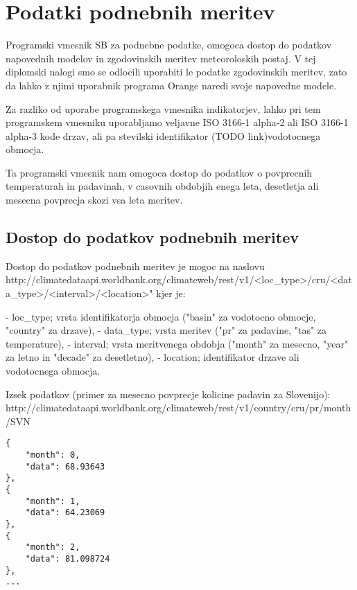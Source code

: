 \section{Podatki podnebnih meritev}

Programski vmesnik SB za podnebne podatke, omogoca dostop do podatkov 
napovednih modelov in zgodovinskih meritev meteoroloskih postaj. V tej 
diplomski nalogi smo se odlocili uporabiti le podatke zgodovinskih meritev, 
zato da lahko z njimi uporabnik programa Orange naredi svoje napovedne modele.

Za razliko od uporabe programskega vmesnika indikatorjev, lahko pri tem
programskem vmesniku uporabljamo veljavne ISO 3166-1 alpha-2 ali ISO 3166-1 
alpha-3 kode drzav, ali pa stevilski identifikator (TODO link)vodotocnega 
obmocja.

Ta programski vmesnik nam omogoca dostop do podatkov o povprecnih temperaturah 
in padavinah, v casovnih obdobjih enega leta, desetletja ali mesecna povprecja 
skozi vsa leta meritev.



\subsection{Dostop do podatkov podnebnih meritev}

Dostop do podatkov podnebnih meritev je mogoc na naslovu
http://climatedataapi.worldbank.org/climateweb/rest/v1/<loc\_type>/cru/<data\_type>/<interval>/<location>"  
kjer je:

- loc\_type; vrsta identifikatorja obmocja ("basin" za vodotocno obmocje, 
  "country" za drzave),
- data\_type; vrsta meritev ("pr" za padavine, "tas" za temperature),
- interval; vrsta meritvenega obdobja ("month" za mesecno, "year" za letno in
  "decade" za desetletno),
- location; identifikator drzave ali vodotocnega obmocja.


Izsek podatkov (primer za mesecno povprecje kolicine padavin za Slovenijo):
http://climatedataapi.worldbank.org/climateweb/rest/v1/country/cru/pr/month/SVN

\begin{lstlisting}
{
    "month": 0,
    "data": 68.93643
},
{
    "month": 1,
    "data": 64.23069
},
{
    "month": 2,
    "data": 81.098724
},
...
\end{lstlisting}











